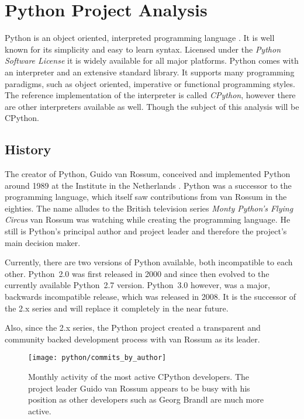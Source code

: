 \section{Python Project Analysis} %


Python is an object oriented, interpreted programming language
\cite{PythonAbout}. It is well known for its simplicity and easy to learn
syntax. Licensed under the \emph{Python Software License} \cite{PythonLicence}
it is widely available for all major platforms. Python comes with an
interpreter and an extensive standard library. It supports many programming
paradigms, such as object oriented, imperative or functional programming
styles. The reference implementation of the interpreter is called
\emph{CPython}, however there are other interpreters available as well. Though
the subject of this analysis will be CPython.

\subsection{History} %

The creator of Python, Guido van Rossum, conceived and implemented Python
around 1989 at the  Institute in the Netherlands
\cite{Venners2003}. Python was a successor to the  programming
language, which itself saw contributions from van Rossum in the eighties. The
name alludes to the British television series \emph{Monty Python's Flying
Circus} van Rossum was watching while creating the programming language. He
still is Python's principal author and project leader and therefore the
project's main decision maker.

Currently, there are two versions of Python available, both incompatible to
each other. Python~2.0 was first released in 2000 and since then evolved to the
currently available Python~2.7 version. Python~3.0 however, was a major,
backwards incompatible release, which was released in 2008. It is the successor
of the 2.x series and will replace it completely in the near future.

Also, since the 2.x series, the Python project created a transparent and
community backed development process with van Rossum as its leader.

\begin{figure}[htbp]
  \centering
  \texttt{[image: python/commits\_by\_author]}
  \caption[Commits by Most Active Authors, Python]
  {Monthly activity of the most active CPython developers. The project
    leader Guido van Rossum appears to be busy with his position as other
    developers such as Georg Brandl are much more active.}
  \label{fig:python:cba}
\end{figure}

